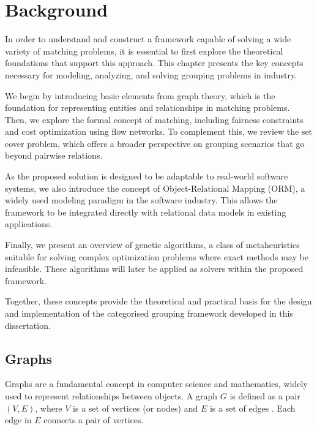 
\chapter{Background} \label{chap:background}

    In order to understand and construct a framework capable of solving a wide variety of matching problems, it is essential to first explore the theoretical foundations that support this approach. This chapter presents the key concepts necessary for modeling, analyzing, and solving grouping problems in industry.

    We begin by introducing basic elements from graph theory, which is the foundation for representing entities and relationships in matching problems. Then, we explore the formal concept of matching, including fairness constraints and cost optimization using flow networks. To complement this, we review the set cover problem, which offers a broader perspective on grouping scenarios that go beyond pairwise relations.

    As the proposed solution is designed to be adaptable to real-world software systems, we also introduce the concept of Object-Relational Mapping (ORM), a widely used modeling paradigm in the software industry. This allows the framework to be integrated directly with relational data models in existing applications.

    Finally, we present an overview of genetic algorithms, a class of metaheuristics suitable for solving complex optimization problems where exact methods may be infeasible. These algorithms will later be applied as solvers within the proposed framework.

Together, these concepts provide the theoretical and practical basis for the design and implementation of the categorised grouping framework developed in this dissertation.
    \section{Graphs}
    
        Graphs are a fundamental concept in computer science and mathematics, widely used to represent relationships between objects. A graph \( G \) is defined as a pair \( (V, E) \), where \( V \) is a set of vertices (or nodes) and \( E \) is a set of edges \cite{cormen}. Each edge in \( E \) connects a pair of vertices.

